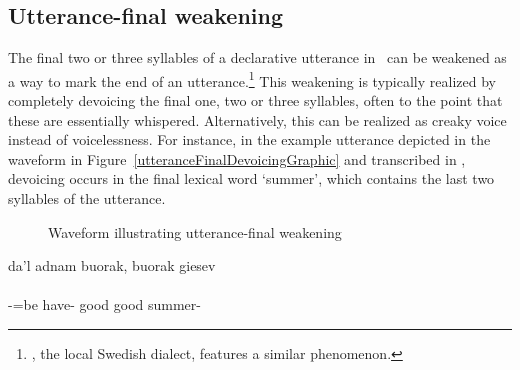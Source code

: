 \subsection{Utterance-final weakening}\label{utteranceFinalDevoicing}
The final two or three syllables of a declarative utterance in \PS\ can be weakened as a way to mark the end of an utterance.\footnote{, the local Swedish dialect, features a similar phenomenon.} 
This weakening is typically realized by completely devoicing the final one, two or three syllables, often to the point that these are essentially whispered. Alternatively, this can be realized as creaky voice instead of voicelessness. For instance, in the example utterance depicted in the waveform in Figure~\vref{utteranceFinalDevoicingGraphic} and transcribed in , devoicing occurs in the final lexical word  ‘summer’, which contains the last two syllables of the utterance. 
\begin{figure}[htb]
\caption{Waveform illustrating utterance-final weakening}\label{utteranceFinalDevoicingGraphic}
\end{figure}
\ea\label{utteranceFinalDevoicing1}%
\glll	da’l adnam buorak, buorak giesev\\
	    \\
	-=be\BS{} have- good good summer-\\\nopagebreak
{} 
\z

